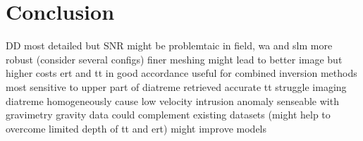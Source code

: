 \section{Conclusion}\label{section:Conclusion}

DD most detailed but SNR might be problemtaic in field, wa and slm more robust (consider several configs)
finer meshing might lead to better image but higher costs
ert and tt in good accordance useful for combined inversion
methods most sensitive to upper part of diatreme retrieved accurate
tt struggle imaging diatreme homogeneously cause low velocity intrusion
anomaly senseable with gravimetry
gravity data could complement existing datasets (might help to overcome limited depth of tt and ert)
might improve models 

